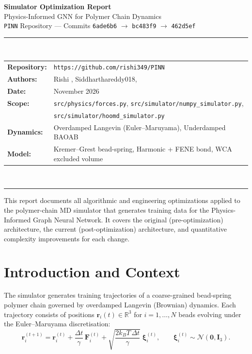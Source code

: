 \documentclass[12pt,a4paper]{article}
\newcommand{\code}[1]{\texttt{#1}}
\begin{document}
\begin{titlepage}
  \centering
  \vspace*{2cm}
  {\Huge\bfseries Simulator Optimization Report}\\[0.8em]
  {\Large Physics-Informed GNN for Polymer Chain Dynamics}\\[0.4em]
  {\large\color{accentblue} \texttt{PINN} Repository — Commits \texttt{6ade6b6} $\to$ \texttt{bc483f9} $\to$ \texttt{462d5ef}}\\[2em]
  \rule{\textwidth}{1pt}\\[1em]
  \begin{tabular}{ll}
    \textbf{Repository:}  & \texttt{https://github.com/rishi349/PINN} \\
    \textbf{Authors:}     & Rishi , Siddharthareddy018, \\
    \textbf{Date:}        & November 2026 \\
    \textbf{Scope:}       & \code{src/physics/forces.py},
                            \code{src/simulator/numpy\_simulator.py},\\
                          & \code{src/simulator/hoomd\_simulator.py}\\
    \textbf{Dynamics:}    & Overdamped Langevin (Euler--Maruyama), Underdamped BAOAB \\
    \textbf{Model:}       & Kremer--Grest bead-spring, Harmonic + FENE bond, WCA excluded volume \\
  \end{tabular}
  \\[2em]
  \rule{\textwidth}{1pt}
  \vfill
  {\small This report documents all algorithmic and engineering optimizations applied to
  the polymer-chain MD simulator that generates training data for the Physics-Informed
  Graph Neural Network. It covers the original (pre-optimization) architecture, the
  current (post-optimization) architecture, and quantitative complexity improvements
  for each change.}
\end{titlepage}

\tableofcontents
\newpage

\section{Introduction and Context}
\label{sec:intro}

The simulator generates training trajectories of a coarse-grained bead-spring polymer
chain governed by overdamped Langevin (Brownian) dynamics.
Each trajectory consists of positions $\mathbf{r}_i(t) \in \mathbb{R}^3$ for
$i = 1, \ldots, N$ beads evolving under the Euler--Maruyama discretisation:
\begin{equation}
  \mathbf{r}_i^{(t+1)}
  = \mathbf{r}_i^{(t)}
  + \frac{\Delta t}{\gamma}\,\mathbf{F}_i^{(t)}
  + \sqrt{\frac{2 k_B T \,\Delta t}{\gamma}}\;\boldsymbol{\xi}_i^{(t)},
  \qquad \boldsymbol{\xi}_i^{(t)} \sim \mathcal{N}(\mathbf{0}, \mathbf{I}_3).
  \label{eq:em}
\end{equation}
\end{document}
